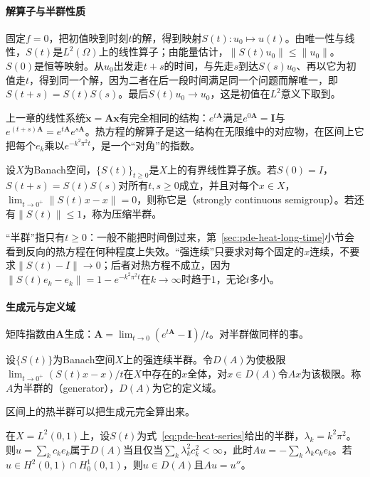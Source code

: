 \paragraph{解算子与半群性质}
固定$f=0$，把初值映到时刻$t$的解，得到映射$S(t):u_0\mapsto u(t)$。由唯一性与线性，$S(t)$是$L^2(\Omega)$上的线性算子；由能量估计，$\|S(t)u_0\|\leq\|u_0\|$。$S(0)$是恒等映射。从$u_0$出发走$t+s$的时间，与先走$s$到达$S(s)u_0$、再以它为初值走$t$，得到同一个解，因为二者在后一段时间满足同一个问题而解唯一，即$S(t+s)=S(t)S(s)$。最后$S(t)u_0\to u_0$，这是初值在$L^2$意义下取到。

上一章的线性系统$\dot{\bm x}=\bm A\bm x$有完全相同的结构：$e^{t\bm A}$满足$e^{0\bm A}=\bm I$与$e^{(t+s)\bm A}=e^{t\bm A}e^{s\bm A}$。热方程的解算子是这一结构在无限维中的对应物，在区间上它把每个$e_k$乘以$e^{-k^2\pi^2t}$，是一个“对角”的指数。

\begin{definition}[强连续半群]
\label{def:pde-c0-semigroup}
设$X$为Banach空间，$\{S(t)\}_{t\geq0}$是$X$上的有界线性算子族。若$S(0)=I$，$S(t+s)=S(t)S(s)$对所有$t,s\geq0$成立，并且对每个$x\in X$，$\lim_{t\to0^+}\|S(t)x-x\|=0$，则称它是（strongly continuous semigroup）。若还有$\|S(t)\|\leq1$，称为压缩半群。
\end{definition}

“半群”指只有$t\geq0$：一般不能把时间倒过来，第~\ref{sec:pde-heat-long-time}小节会看到反向的热方程在何种程度上失效。“强连续”只要求对每个固定的$x$连续，不要求$\|S(t)-I\|\to0$；后者对热方程不成立，因为$\|S(t)e_k-e_k\|=1-e^{-k^2\pi^2t}$在$k\to\infty$时趋于$1$，无论$t$多小。

\paragraph{生成元与定义域}
矩阵指数由$\bm A$生成：$\bm A=\lim_{t\to0}(e^{t\bm A}-\bm I)/t$。对半群做同样的事。

\begin{definition}[生成元]
\label{def:pde-generator}
设$\{S(t)\}$为Banach空间$X$上的强连续半群。令$D(A)$为使极限$\lim_{t\to0^+}(S(t)x-x)/t$在$X$中存在的$x$全体，对$x\in D(A)$令$Ax$为该极限。称$A$为半群的（generator），$D(A)$为它的定义域。
\end{definition}

区间上的热半群可以把生成元完全算出来。

\begin{theorem}[区间上热半群的生成元]
\label{thm:pde-heat-generator}
在$X=L^2(0,1)$上，设$S(t)$为式~\eqref{eq:pde-heat-series}给出的半群，$\lambda_k=k^2\pi^2$。则$u=\sum_kc_ke_k$属于$D(A)$当且仅当$\sum_k\lambda_k^2c_k^2<\infty$，此时$Au=-\sum_k\lambda_kc_ke_k$。若$u\in H^2(0,1)\cap H_0^1(0,1)$，则$u\in D(A)$且$Au=u''$。
\end{theorem}

